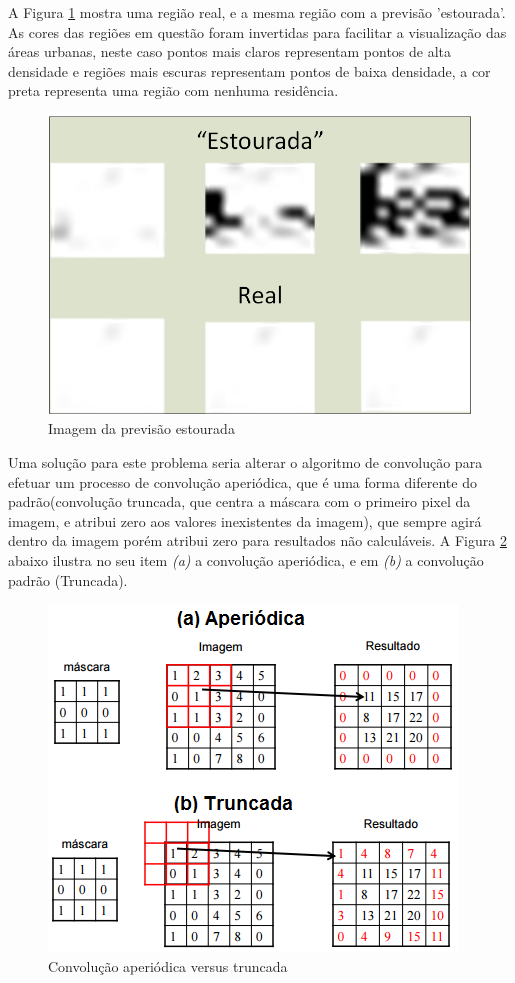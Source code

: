 A Figura \ref{fig:ForecastingSpike} mostra uma região real, e a mesma região com a previsão 'estourada'. As cores das regiões em questão foram invertidas para facilitar a visualização das áreas urbanas, neste caso pontos mais claros representam pontos de alta densidade e regiões mais escuras representam pontos de baixa densidade, a cor preta representa uma região com nenhuma residência.

\begin{figure}[h]
	\centering	
    \includegraphics[scale=1]{Figuras/Image-PrevisaoEstourada.png}
	\caption{Imagem da previsão estourada}
	\label{fig:ForecastingSpike}
\end{figure}

Uma solução para este problema seria alterar o algoritmo de convolução para efetuar um processo de convolução aperiódica, que é uma forma diferente do padrão(convolução truncada, que centra a máscara com o primeiro pixel da imagem, e atribui zero aos valores inexistentes da imagem), que sempre agirá dentro da imagem porém atribui zero para resultados não calculáveis. A Figura \ref{fig:convApvsTr} abaixo ilustra no seu item \emph{(a)} a convolução aperiódica, e em \emph{(b)} a convolução padrão (Truncada).

\begin{figure}[h]
	\centering	
    \includegraphics[scale=1]{Figuras/ConvolucaoAperiodica.png}
	\caption{Convolução aperiódica versus truncada}
	\label{fig:convApvsTr}
\end{figure}

